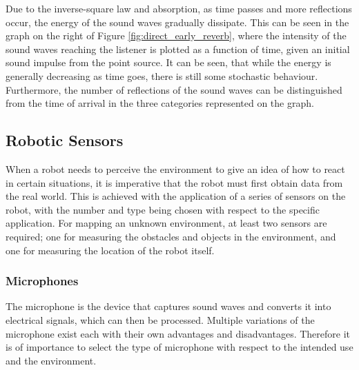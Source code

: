 Due to the inverse-square law and absorption, as time passes and more reflections occur, the energy of the sound waves gradually dissipate. This can be seen in the graph on the right of Figure \ref{fig:direct_early_reverb}, where the intensity of the sound waves reaching the listener is plotted as a function of time, given an initial sound impulse from the point source. It can be seen, that while the energy is generally decreasing as time goes, there is still some stochastic behaviour. Furthermore, the number of reflections of the sound waves can be distinguished from the time of arrival in the three categories represented on the graph.

\subsection{Robotic Sensors}\label{subsec:RoboticSensors}
When a robot needs to perceive the environment to give an idea of how to react in certain situations, it is imperative that the robot must first obtain data from the real world. This is achieved with the application of a series of sensors on the robot, with the number and type being chosen with respect to the specific application. For mapping an unknown environment, at least two sensors are required; one for measuring the obstacles and objects in the environment, and one for measuring the location of the robot itself.



\subsubsection{Microphones}
The microphone is the device that captures sound waves and converts it into electrical signals, which can then be processed. Multiple variations of the microphone exist each with their own advantages and disadvantages. Therefore it is of importance to select the type of microphone with respect to the intended use and the environment. \cite{Acoustics:Audio_production}

